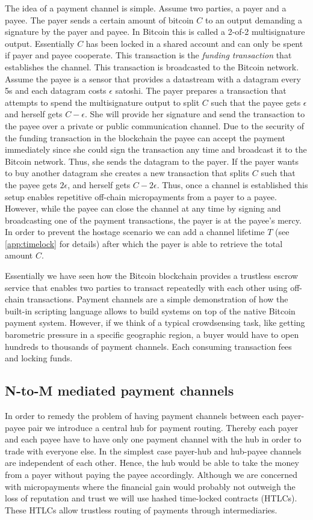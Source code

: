 \documentclass[10pt,journal,compsoc]{IEEEtran}
\begin{document}
The idea of a payment channel is simple. Assume two parties, a payer and a payee. The payer sends a certain amount of bitcoin $C$ to an output demanding a signature by the payer and payee. In Bitcoin this is called a 2-of-2 multisignature output. Essentially $C$ has been locked in a shared account and can only be spent if payer and payee cooperate. This transaction is the \emph{funding transaction} that establishes the channel. This transaction is broadcasted to the Bitcoin network. Assume the payee is a sensor that provides a datastream with a datagram every 5s and each datagram costs $\epsilon$ satoshi. The payer prepares a transaction that attempts to spend the multisignature output to split $C$ such that the payee gets $\epsilon$ and herself gets $C-\epsilon$. She will provide her signature and send the transaction to the payee over a private or public communication channel. Due to the security of the funding transaction in the blockchain the payee can accept the payment immediately since she could sign the transaction any time and broadcast it to the Bitcoin network. Thus, she sends the datagram to the payer. If the payer wants to buy another datagram she creates a new transaction that splits $C$ such that the payee gets $2\epsilon$, and herself gets $C-2\epsilon$. Thus, once a channel is established this setup enables repetitive off-chain micropayments from a payer to a payee. However, while the payee can close the channel at any time by signing and broadcasting one of the payment transactions, the payer is at the payee's mercy. In order to prevent the hostage scenario we can add a channel lifetime $T$ (see \ref{app:timelock} for details) after which the payer is able to retrieve the total amount $C$.


Essentially we have seen how the Bitcoin blockchain provides a trustless escrow service that enables two parties to transact repeatedly with each other using off-chain transactions. Payment channels are a simple demonstration of how the built-in scripting language allows to build systems on top of the native Bitcoin payment system. However, if we think of a typical crowdsensing task, like getting barometric pressure in a specific geographic region, a buyer would have to open hundreds to thousands of payment channels. Each consuming transaction fees and locking funds. 

\subsection{N-to-M mediated payment channels}
\label{sec:mediated}
In order to remedy the problem of having payment channels between each payer-payee pair we introduce a central hub for payment routing. Thereby each payer and each payee have to have only one payment channel with the hub in order to trade with everyone else. In the simplest case payer-hub and hub-payee channels are independent of each other. Hence, the hub would be able to take the money from a payer without paying the payee accordingly. Although we are concerned with micropayments where the financial gain would probably not outweigh the loss of reputation and trust we will use hashed time-locked contracts (HTLCs). These HTLCs allow trustless routing of payments through intermediaries. 
\end{document}
